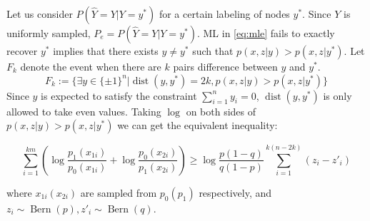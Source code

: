 \documentclass[conference,letterpaper]{IEEEtran}
\DeclareMathOperator{\dist}{dist}
\DeclareMathOperator{\Bern}{Bern}
\begin{document}
Let us consider $P(\hat{Y}=Y|Y=y^*)$ for a certain labeling of nodes $y^*$.
Since $Y$ is uniformly sampled, $P_e=P(\hat{Y}=Y|Y=y^*)$.
ML in \eqref{eq:mle} fails to exactly recover $y^*$ implies that
there exists $y\neq y^*$ such that $p(x,z|y) > p(x,z|y^*)$.
Let $F_k$ denote
the event when there are $k$ pairs difference
between $y$ and $y^*$.
\begin{equation}\label{eq:Fk}
F_k:=\{\exists y \in \{\pm 1\}^n | \dist(y, y^*)=2k, p(x,z|y) > p(x,z|y^*) \}
\end{equation}
Since
$y$ is expected to satisfy the constraint $\sum_{i=1}^n y_i=0$, $\dist(y, y^*)$ is only allowed to take even
values. Taking $\log$ on both sides of $p(x,z|y) > p(x,z|y^*)$ we can get the equivalent inequality:

\begin{equation}\label{eq:ein}
\sum_{i=1}^{km} (\log \frac{p_1(x_{1i})}{p_0(x_{1i})}
+ \log \frac{p_0(x_{2i})}{p_1(x_{2i})})
\geq \log \frac{p(1-q)}{q(1-p)} \sum_{i=1}^{k(n-2k)}(z_{i} - z'_{i})
\end{equation}

where $x_{1i}(x_{2i})$ are sampled from $p_0(p_1)$ respectively,
and $z_{i} \sim \Bern(p), z'_{i} \sim \Bern(q)$.
\end{document}
